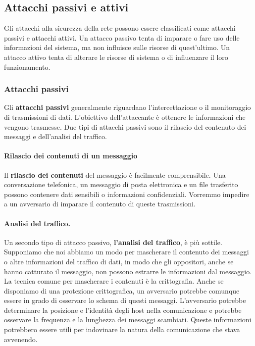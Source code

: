 \subsection{Attacchi passivi e attivi}
Gli attacchi alla sicurezza della rete possono essere classificati
come attacchi passivi e attacchi attivi. Un attacco passivo tenta di imparare o fare
uso delle informazioni del sistema, ma non influisce sulle risorse di quest'ultimo. Un attacco attivo tenta di alterare le risorse di sistema o di influenzare il loro funzionamento.

\subsubsection{Attacchi passivi}
Gli \textbf{attacchi passivi} generalmente riguardano l'intercettazione o il monitoraggio di trasmissioni di dati. L'obiettivo dell'attaccante è ottenere le informazioni che vengono trasmesse. Due tipi di attacchi passivi sono il rilascio del contenuto dei messaggi e dell'analisi del traffico.

\paragraph{Rilascio dei contenuti di un messaggio} Il \textbf{rilascio dei contenuti} del messaggio è facilmente comprensibile. Una conversazione telefonica, un messaggio di posta elettronica e un file trasferito possono contenere dati sensibili o informazioni confidenziali. Vorremmo impedire a un avversario di imparare il contenuto di queste trasmissioni.

\paragraph{Analisi del traffico.} Un secondo tipo di attacco passivo, \textbf{l'analisi del traffico}, è più sottile. Supponiamo che noi abbiamo un modo per mascherare il contenuto dei messaggi o altre informazioni del traffico di dati, in modo che gli oppositori, anche se hanno catturato il messaggio, non possono estrarre le informazioni dal messaggio. La tecnica comune per mascherare i contenuti è la crittografia. Anche se disponiamo di una protezione crittografica, un avversario potrebbe comunque essere in grado di osservare lo schema di questi messaggi. L'avversario potrebbe determinare la posizione e l'identità degli host nella comunicazione e potrebbe osservare la frequenza e la lunghezza dei messaggi scambiati. Queste informazioni potrebbero essere utili per indovinare la natura della comunicazione che stava avvenendo.

